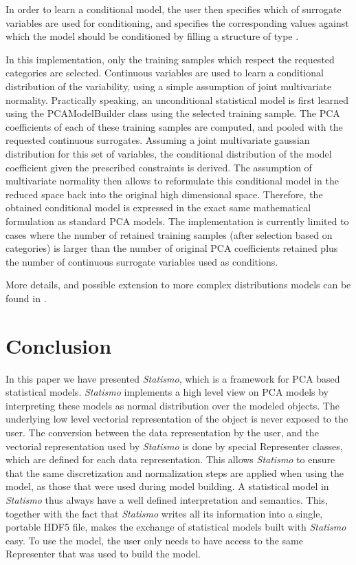 \documentclass{InsightArticle}
\newcommand{\Statismo}{\emph{Statismo}\xspace}
\begin{document}
In order to learn a conditional model, the user then specifies which
of surrogate variables are used for conditioning, and specifies the
corresponding values against which the model should be conditioned by
filling a structure of type .

In this implementation, only the training samples which respect the
requested categories are selected.  Continuous variables are used to
learn a conditional distribution of the variability, using a simple
assumption of joint multivariate normality. Practically speaking, an
unconditional statistical model is first learned using the
PCAModelBuilder class using the selected training sample. The PCA
coefficients of each of these training samples are computed, and
pooled with the requested continuous surrogates. Assuming a joint
multivariate gaussian distribution for this set of variables, the
conditional distribution of the model coefficient given the prescribed
constraints is derived. The assumption of multivariate normality then
allows to reformulate this conditional model in the reduced space back
into the original high dimensional space. Therefore, the obtained
conditional model is expressed in the exact same mathematical
formulation as standard PCA models.  The implementation is currently
limited to cases where the number of retained training samples (after
selection based on categories) is larger than the number of original
PCA coefficients retained plus the number of continuous surrogate
variables used as conditions.

More details, and possible extension to more complex distributions
models can be found in \cite{blanc_conditional_2009}.

\section{Conclusion}
In this paper we have presented \Statismo, which is a framework for
PCA based statistical models.  \Statismo implements a high level view
on PCA models by interpreting these models as normal distribution over
the modeled objects. The underlying low level vectorial representation
of the object is never exposed to the user.  The conversion between
the data representation by the user, and the vectorial representation
used by \Statismo is done by special Representer classes, which are
defined for each data representation. This allows \Statismo to ensure
that the same discretization and normalization steps are applied when
using the model, as those that were used during model building.  A
statistical model in \Statismo thus always have a well defined
interpretation and semantics.  This, together with the fact that
\Statismo writes all its information into a single, portable HDF5
file, makes the exchange of statistical models built with \Statismo
easy. To use the model, the user only needs to have access to the same Representer that was used to build the model. 
\end{document}
